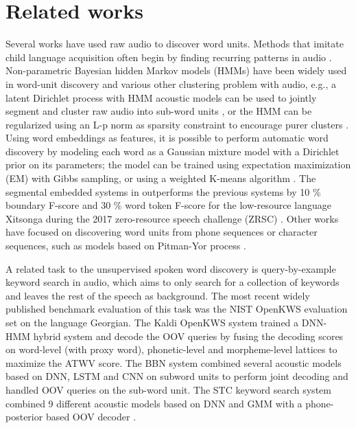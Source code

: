 \documentclass[journal]{IEEEtran}
\begin{document}
 
\section{Related works}
Several works have used raw audio to discover word units. Methods that imitate child language acquisition often begin by finding recurring patterns in audio \cite{Rasanen2015, Park2008}. Non-parametric Bayesian hidden Markov models (HMMs) have been widely used in word-unit discovery and various other clustering problem with audio, e.g., a latent Dirichlet process with HMM acoustic models can be used to jointly segment and cluster raw audio into sub-word units \cite{Lee2012, Ondel2018}, or the HMM can be regularized using an L-p norm as sparsity constraint to encourage purer clusters \cite{Bharadwaj2013}. Using word embeddings as features, it is possible to perform automatic word discovery by modeling each word as a Gaussian mixture model with a Dirichlet prior on its parameters; the model can be trained using expectation maximization (EM) with Gibbs sampling, or using a weighted K-means algorithm \cite{Kamper2017}. The segmental embedded systems in \cite{Kamper2017} outperforms the previous systems by 10 \% boundary F-score and 30 \% word token F-score for the low-resource language Xitsonga during the 2017 zero-resource speech challenge (ZRSC) \cite{Dunbar2017}. Other works have focused on discovering word units from phone sequences or character sequences, such as models based on Pitman-Yor process \cite{Johnson2007}. 

A related task to the unsupervised spoken word discovery is query-by-example keyword search in audio, which aims to only search for a collection of keywords and leaves the rest of the speech as background.
The most recent widely published benchmark evaluation of this task was the
NIST OpenKWS evaluation set on the language Georgian.
The Kaldi OpenKWS system \cite{Trmal2017} trained a DNN-HMM hybrid system and decode the OOV queries by fusing the decoding scores on word-level (with proxy word), phonetic-level and morpheme-level lattices to maximize the ATWV score.
The BBN system \cite{Alumae16} combined several acoustic models based on DNN, LSTM and CNN on subword units to perform joint decoding and handled OOV queries on the sub-word unit.
The STC keyword search system \cite{Medennikov2017} combined 9 different acoustic models based on DNN and GMM with a phone-posterior based OOV decoder \cite{Khokhlov2017}.  
\end{document}
